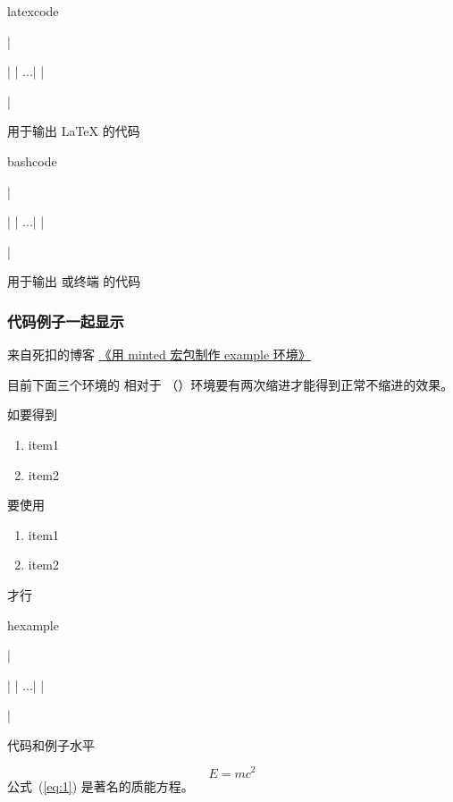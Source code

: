 \documentclass{xdyy-usermanual}
\begin{document}
\begin{function}{latexcode}
  \begin{syntax}
    |\begin{latexcode}|
      |  ...|
    |\end{latexcode}|
  \end{syntax}
  用于输出 \LaTeX{} 的代码
\end{function}

\begin{function}{bashcode}
  \begin{syntax}
    |\begin{bashcode}|
      |  ...|
    |\end{bashcode}|
  \end{syntax}
  用于输出  或终端 的代码
\end{function}



\subsubsection{代码例子一起显示}
来自死扣的博客 \href{https://sikouhjw.github.io/2020/04/29/2020-04-29-Make-an-example-environment-with-minted}{《用 minted 宏包制作 example 环境》}

\begin{remark}
  目前下面三个环境的  相对于  （）环境要有两次缩进才能得到正常不缩进的效果。
\end{remark}
如要得到
\begin{latexcode}
    \begin{enumerate}
      \item item1
      \item item2
    \end{enumerate}
\end{latexcode}
要使用
\begin{latexcode}
    \begin{...example}
        \begin{enumerate}
          \item item1
          \item item2
        \end{enumerate}
    \end{...example}
\end{latexcode}
才行

\begin{function}{hexample}
  \begin{syntax}
    |\begin{hexample}|
      |    ...|
    |\end{hexample}|
  \end{syntax}
  代码和例子水平
\end{function}
\begin{hexample}
    \begin{equation}\label{eq:1}
      E = mc^2
    \end{equation}
    公式~(\ref{eq:1}) 是著名的质能方程。
\end{hexample}
\end{document}
